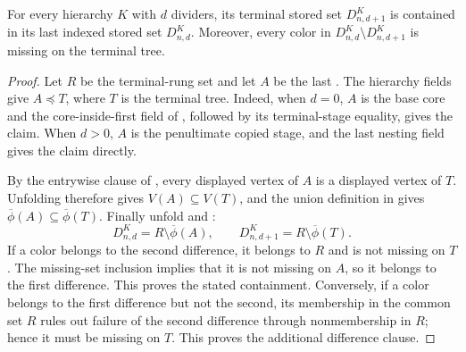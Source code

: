 \begin{lemma}
For every hierarchy $K$ with $d$ dividers, its terminal stored set
$D^K_{n,d+1}$ is contained in its last indexed stored set $D^K_{n,d}$.
Moreover, every color in $D^K_{n,d}\setminus D^K_{n,d+1}$ is missing on
the terminal tree.
\end{lemma}
\begin{proof}
Let $R$ be the terminal-rung  set and let
$A$ be the last .  The hierarchy fields
give $A\preccurlyeq T$, where $T$ is the terminal tree.  Indeed, when
$d=0$, $A$ is the base core and the core-inside-first field of
, followed by its terminal-stage equality,
gives the claim.  When $d>0$, $A$ is the penultimate copied stage, and the
last nesting field gives the claim directly.

By the entrywise clause of , every
displayed vertex of $A$ is a displayed vertex of $T$.  Unfolding
 therefore gives $V(A)\subseteq V(T)$,
and the union definition in  gives
$\overline\phi(A)\subseteq\overline\phi(T)$.  Finally unfold
 and
:
\[
 D^K_{n,d}=R\setminus\overline\phi(A),\qquad
 D^K_{n,d+1}=R\setminus\overline\phi(T).
\]
If a color belongs to the second difference, it belongs to $R$ and is not
missing on $T$.  The missing-set inclusion implies that it is not missing
on $A$, so it belongs to the first difference.  This proves the stated
containment.  Conversely, if a color belongs to the first difference but
not the second, its membership in the common set $R$ rules out failure of
the second difference through nonmembership in $R$; hence it must be
missing on $T$.  This proves the additional difference clause.
\end{proof}
